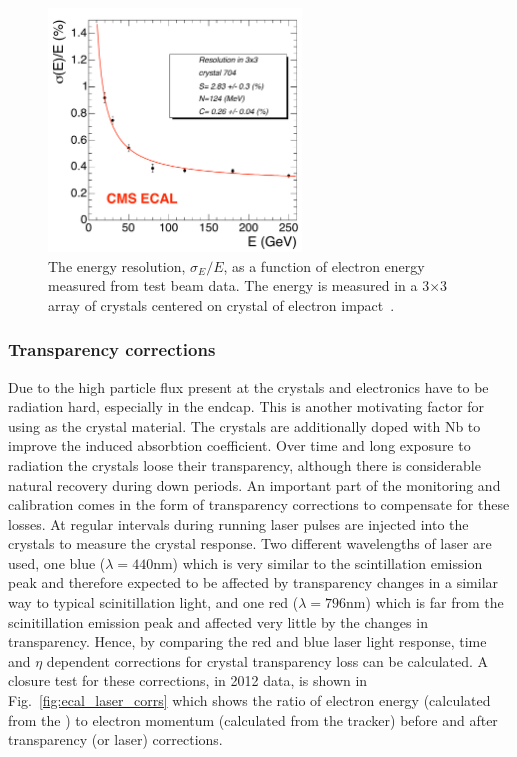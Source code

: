 \begin{figure}
  \includegraphics[width=0.6\textwidth]{cms_experiment/plots/ecal_sigma_e_test_beam.pdf}
  \caption[ECAL energy resolution]{The \ECAL energy resolution, $\sigma_{E}/E$, as a function of electron energy measured from test beam data. The energy is measured in a 3$\times$3 array of crystals centered on crystal of electron impact~\cite{CMS_JINST}.}
  \label{fig:sigma_e_test_beam}
\end{figure}

\subsubsection{Transparency corrections}

Due to the high particle flux present at \CMS the \ECAL crystals and electronics have to be radiation hard, especially in the endcap. This is another motivating factor for using \PbWO as the crystal material. The crystals are additionally doped with Nb to improve the induced absorbtion coefficient. Over time and long exposure to radiation the crystals loose their transparency, although there is considerable natural recovery during down periods. An important part of the \ECAL monitoring and calibration comes in the form of transparency corrections to compensate for these losses. At regular intervals during \LHC running laser pulses are injected into the crystals to measure the crystal response. Two different wavelengths of laser are used, one blue ($\lambda=440$nm) which is very similar to the scintillation emission peak and therefore expected to be affected by transparency changes in a similar way to typical scinitillation light, and one red ($\lambda=796$nm) which is far from the scinitillation emission peak and affected very little by the changes in transparency. Hence, by comparing the red and blue laser light response, time and $\eta$ dependent corrections for crystal transparency loss can be calculated. A closure test for these corrections, in 2012 data, is shown in Fig.~\ref{fig:ecal_laser_corrs} which shows the ratio of electron energy (calculated from the \ECAL) to electron momentum (calculated from the tracker) before and after transparency (or laser) corrections. 

